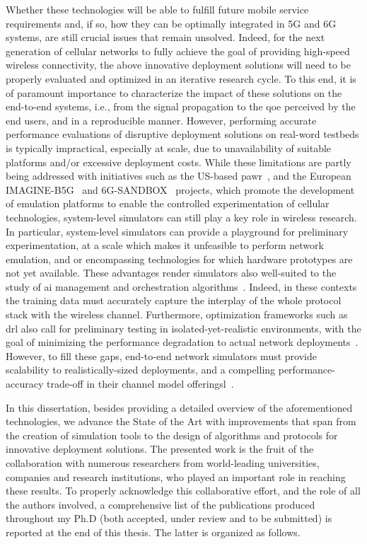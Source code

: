 Whether these technologies will be able to fulfill future mobile service requirements and, if so, how they can be optimally integrated in 5G and 6G systems, are still crucial issues that remain unsolved. 
Indeed, for the next generation of cellular networks to fully achieve the goal of providing high-speed wireless connectivity, the above innovative deployment solutions will need to be properly evaluated and optimized in an iterative research cycle. To this end, it is of paramount importance to characterize the impact of these solutions on the end-to-end systems, i.e., from the signal propagation to the \gls{qoe} perceived by the end users, and in a reproducible manner.
However, performing accurate performance evaluations of disruptive deployment solutions on real-word testbeds is typically impractical, especially at scale, due to unavailability of suitable platforms and/or excessive deployment costs.
While these limitations are partly being addressed with initiatives such as the US-based \gls{pawr}~\cite{BONATI2023109502}, and the European IMAGINE-B5G~\cite{10597052} and 6G-SANDBOX~\cite{10597112} projects, which promote the development of emulation platforms to enable the controlled experimentation of cellular technologies, system-level simulators can still play a key role in wireless research.
In particular, system-level simulators can provide a playground for preliminary experimentation, at a scale which makes it unfeasible to perform network emulation, and or encompassing technologies for which hardware prototypes are not yet available. 
These advantages render simulators also well-suited to the study of \gls{ai} management and orchestration algorithms~\cite{polese2022colo}.
Indeed, in these contexts the training data must accurately capture the interplay of the whole protocol stack with the wireless channel. Furthermore, optimization frameworks such as \gls{drl} also call for preliminary testing in isolated-yet-realistic environments, with the goal of minimizing the performance degradation to actual network deployments~\cite{lacava2022programmable, amir2023safehaul}.
However, to fill these gaps, end-to-end network simulators must provide scalability to realistically-sized deployments, and a compelling performance-accuracy trade-off in their channel model offeringsl~\cite{testolina2020scalable}.

In this dissertation, besides providing a detailed overview of the aforementioned technologies, we advance the State of the Art with improvements that span from the creation of simulation tools to the design of algorithms and protocols for innovative deployment solutions.
The presented work is the fruit of the collaboration with numerous researchers from world-leading universities, companies and research institutions, who played an important role in reaching these results. To properly acknowledge this collaborative effort, and the role of all the
authors involved, a comprehensive list of the publications produced throughout my Ph.D (both accepted, under review and to be submitted) is reported at the end of this thesis. The latter is organized as follows.

